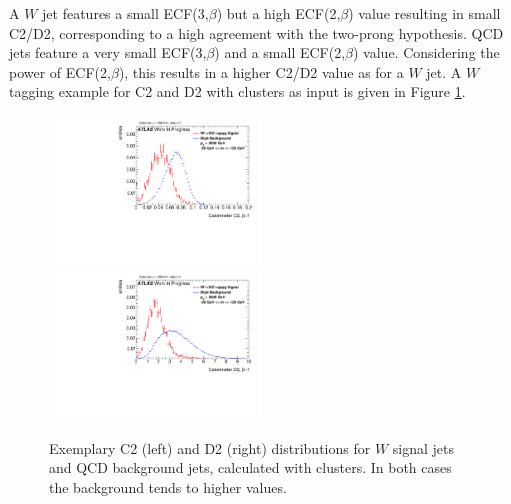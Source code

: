 A $W$ jet features a small ECF(3,$\beta$) but a high ECF(2,$\beta$) value resulting in small C2/D2, corresponding to a high agreement with the two-prong hypothesis. QCD jets feature a very small ECF(3,$\beta$) and a small ECF(2,$\beta$) value. Considering the power of ECF(2,$\beta$), this results in a higher C2/D2 value as for a $W$ jet. A $W$ tagging example for C2 and D2 with clusters as input is given in Figure \ref{fig:ECF_example}.
\begin{figure}
\includegraphics[width=0.5\textwidth]{sascha_input/plots/W/Beta1/h_recoJet_C2_bin6.pdf} \hspace{1mm}
\includegraphics[width=0.5\textwidth]{sascha_input/plots/W/Beta1/h_recoJet_D2_bin6.pdf} 
\caption{Exemplary C2 (left) and D2 (right) distributions for $W$ signal jets and QCD background jets, calculated with clusters. In both cases the background tends to higher values.}\label{fig:ECF_example}
\end{figure}